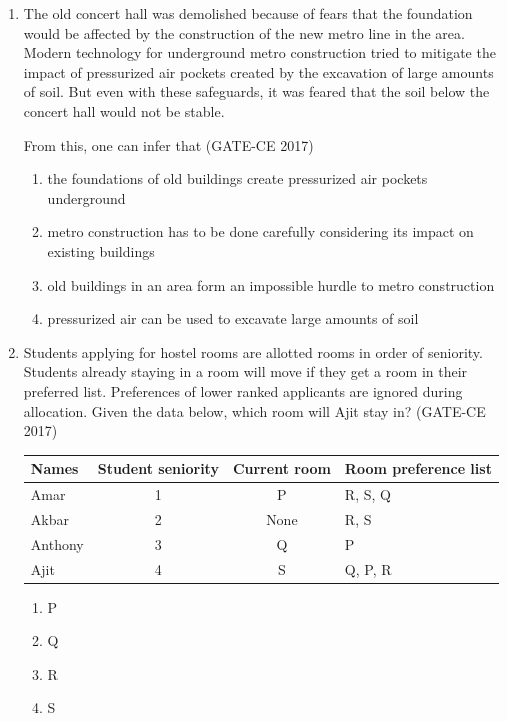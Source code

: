 \documentclass[journal,12pt,onecolumn]{article}
\theoremstyle{remark}
\begin{document}
\begin{enumerate}
    \item The old concert hall was demolished because of fears that the foundation would be affected by the construction of the new metro line in the area. Modern technology for underground metro construction tried to mitigate the impact of pressurized air pockets created by the excavation of large amounts of soil. But even with these safeguards, it was feared that the soil below the concert hall would not be stable.
    
    From this, one can infer that \hfill (GATE-CE 2017)
    \begin{enumerate}
        \item the foundations of old buildings create pressurized air pockets underground
        \item metro construction has to be done carefully considering its impact on existing buildings
        \item old buildings in an area form an impossible hurdle to metro construction
        \item pressurized air can be used to excavate large amounts of soil
    \end{enumerate}

    \item Students applying for hostel rooms are allotted rooms in order of seniority. Students already staying in a room will move if they get a room in their preferred list. Preferences of lower ranked applicants are ignored during allocation.
    Given the data below, which room will Ajit stay in? \hfill (GATE-CE 2017)
    \begin{table}[H]
    \centering
    \begin{tabular}{|l|c|c|l|}
    \hline
    Names & Student seniority & Current room & Room preference list \\
    \hline
    Amar & 1 & P & R, S, Q \\
    Akbar & 2 & None & R, S \\
    Anthony & 3 & Q & P \\
    Ajit & 4 & S & Q, P, R \\
    \hline
    \end{tabular}
    \end{table}
    \begin{multicols}{4}
    \begin{enumerate}
        \item P
        \item Q
        \item R
        \item S
    \end{enumerate}
    \end{multicols}


\end{enumerate}
\end{document}
